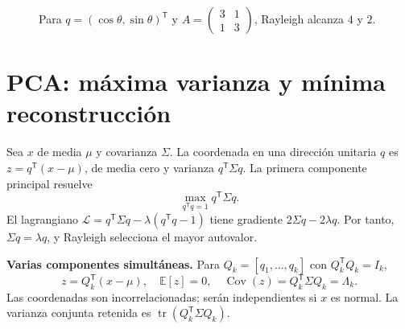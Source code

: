 \documentclass[11pt,a4paper]{article}
\newcommand{\E}{\mathbb E}
\newcommand{\T}{^{\mathsf T}}
\DeclareMathOperator{\Cov}{Cov}
\DeclareMathOperator{\tr}{tr}
\newcommand{\topic}[2]{\clearpage\section{#1}\label{#2}}
\theoremstyle{definition}\newtheorem{definicion}[teorema]{Definición}
\begin{document}
\begin{figure}[H]\centering
{}
\caption{Para $q=(\cos\theta,\sin\theta)^\mathsf T$ y $A=\left(\begin{smallmatrix}3&1\\1&3\end{smallmatrix}\right)$, Rayleigh alcanza $4$ y $2$.}
\end{figure}
\topic{PCA: máxima varianza y mínima reconstrucción}{s28}
Sea $x$ de media $\mu$ y covarianza $\Sigma$.
La coordenada en una dirección unitaria $q$ es
$z=q\T(x-\mu)$, de media cero y varianza $q\T\Sigma q$.
La primera componente principal resuelve
\[
\max_{q\T q=1}q\T\Sigma q.
\]
El lagrangiano $\mathcal L=q\T\Sigma q-\lambda(q\T q-1)$ tiene
gradiente $2\Sigma q-2\lambda q$. Por tanto,
$\Sigma q=\lambda q$, y Rayleigh selecciona el mayor autovalor.

\textbf{Varias componentes simultáneas.}
Para $Q_k=[q_1,\ldots,q_k]$ con $Q_k\T Q_k=I_k$,
\[
z=Q_k\T(x-\mu),\quad
\E[z]=0,\quad \Cov(z)=Q_k\T\Sigma Q_k=\Lambda_k.
\]
Las coordenadas son incorrelacionadas; serán independientes si $x$ es
normal. La varianza conjunta retenida es $\tr(Q_k\T\Sigma Q_k)$.
\end{document}

